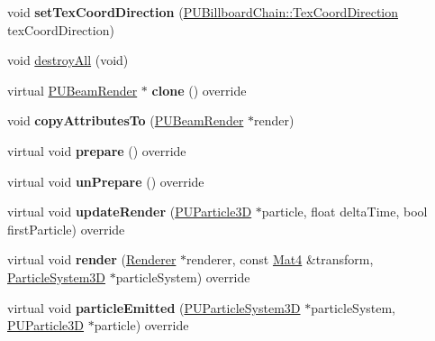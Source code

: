 \begin{DoxyCompactItemize}
\item 
\mbox{\label{classPUBeamRender_a5b58b1d933ba62d77687c3d4e18b972b}} 
void {\bfseries set\+Tex\+Coord\+Direction} (\hyperlink{classPUBillboardChain_a6ebaec09a615199356b9d50fdab2209f}{P\+U\+Billboard\+Chain\+::\+Tex\+Coord\+Direction} tex\+Coord\+Direction)
\item 
void \hyperlink{classPUBeamRender_a17f26eb0e5608cfa4b4c9b16e4a5ccb5}{destroy\+All} (void)
\item 
\mbox{\label{classPUBeamRender_a02f8f7afa79d149fd66c2ca1e93fa964}} 
virtual \hyperlink{classPUBeamRender}{P\+U\+Beam\+Render} $\ast$ {\bfseries clone} () override
\item 
\mbox{\label{classPUBeamRender_abb134ff31424a6a933d165edef351de5}} 
void {\bfseries copy\+Attributes\+To} (\hyperlink{classPUBeamRender}{P\+U\+Beam\+Render} $\ast$render)
\item 
\mbox{\label{classPUBeamRender_ad70adfe17b038222dd058d605d72c49e}} 
virtual void {\bfseries prepare} () override
\item 
\mbox{\label{classPUBeamRender_a0c73903c9afd848a993d0dd20de3577b}} 
virtual void {\bfseries un\+Prepare} () override
\item 
\mbox{\label{classPUBeamRender_ae6fe98433f3034b5b832ffdec3ee7ecf}} 
virtual void {\bfseries update\+Render} (\hyperlink{structPUParticle3D}{P\+U\+Particle3D} $\ast$particle, float delta\+Time, bool first\+Particle) override
\item 
\mbox{\label{classPUBeamRender_a888813d256d812817ab778dbf6c307f7}} 
virtual void {\bfseries render} (\hyperlink{classRenderer}{Renderer} $\ast$renderer, const \hyperlink{classMat4}{Mat4} \&transform, \hyperlink{classParticleSystem3D}{Particle\+System3D} $\ast$particle\+System) override
\item 
\mbox{\label{classPUBeamRender_ae5317f66ef82e6a762532ed7c878d75c}} 
virtual void {\bfseries particle\+Emitted} (\hyperlink{classPUParticleSystem3D}{P\+U\+Particle\+System3D} $\ast$particle\+System, \hyperlink{structPUParticle3D}{P\+U\+Particle3D} $\ast$particle) override

\end{DoxyCompactItemize}
